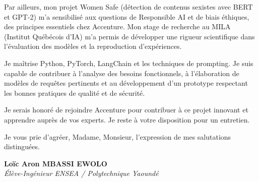 \documentclass[a4paper,11pt]{article}
\begin{document}
Par ailleurs, mon projet Women Safe (détection de contenus sexistes avec BERT et GPT-2) m'a sensibilisé aux questions de Responsible AI et de biais éthiques, des principes essentiels chez Accenture. Mon stage de recherche au MILA (Institut Québécois d'IA) m'a permis de développer une rigueur scientifique dans l'évaluation des modèles et la reproduction d'expériences.

Je maîtrise Python, PyTorch, LangChain et les techniques de prompting. Je suis capable de contribuer à l'analyse des besoins fonctionnels, à l'élaboration de modèles de requêtes pertinents et au développement d'un prototype respectant les bonnes pratiques de qualité et de sécurité.

Je serais honoré de rejoindre Accenture pour contribuer à ce projet innovant et apprendre auprès de vos experts. Je reste à votre disposition pour un entretien.

Je vous prie d'agréer, Madame, Monsieur, l'expression de mes salutations distinguées.

\vspace{0.8cm}

\textbf{Loïc Aron MBASSI EWOLO}\\
\textit{Élève-Ingénieur ENSEA / Polytechnique Yaoundé}
\end{document}

